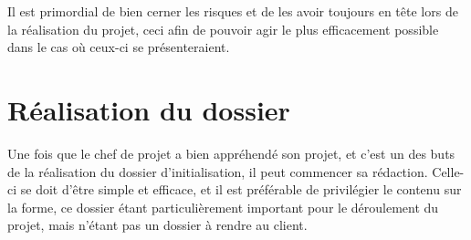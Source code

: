 \documentclass[a4paper, 11pt, draft]{article}
\begin{document}
Il est primordial de bien cerner les risques et de les avoir toujours en tête lors de la réalisation du projet, ceci afin de pouvoir agir le plus efficacement possible dans le cas où ceux-ci se présenteraient.

\section{Réalisation du dossier}

    Une fois que le chef de projet a bien appréhendé son projet, et c'est un des buts de la réalisation du dossier d'initialisation, il peut commencer sa rédaction. Celle-ci se doit d'être simple et efficace, et il est préférable de privilégier le contenu sur la forme, ce dossier étant particulièrement important pour le déroulement du projet, mais n'étant pas un dossier à rendre au client.
\end{document}
